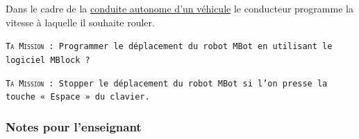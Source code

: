\begin{eleve}
Dans le cadre de la \href{https://www.youtube.com/watch?v=HMhzLhQLoBQ}{conduite autonome d’un véhicule} le conducteur programme la vitesse à laquelle il souhaite rouler.

\texttt{\large\textsc{Ta Mission} : Programmer le déplacement du robot MBot en utilisant le logiciel MBlock ?}
\end{eleve}


\begin{eleve}
\texttt{\large\textsc{Ta Mission} : Stopper le déplacement du robot MBot si l’on presse la touche « Espace » du clavier.}
\end{eleve}



\subsubsection{Notes pour l'enseignant}

